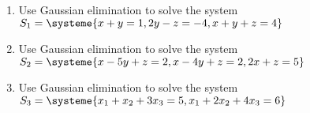 \documentclass[11pt,fleqn]{article}
\begin{document}
\renewcommand{\headrulewidth}{0pt}
\newcommand{\blank}[1]{\rule{#1}{0.75pt}}
\renewcommand{\d}{\displaystyle}
\vspace*{-0.7in}
\begin{center}
 \textbf{ \large {} }
\end{center}

\begin{enumerate}
\item Use Gaussian elimination to solve the system $S_1=\systeme{x+y=1, 2y-z=-4,x+y+z=4}$
\vfill
\item Use Gaussian elimination to solve the system $S_2=\systeme{x-5y+z=2, x-4y+z=2,2x+z=5}$
\vfill
\newpage
\item Use Gaussian elimination to solve the system $S_3=\systeme{x_1+x_2+3x_3=5,x_1+2x_2+4x_3=6}$
\end{enumerate}
\end{document}
